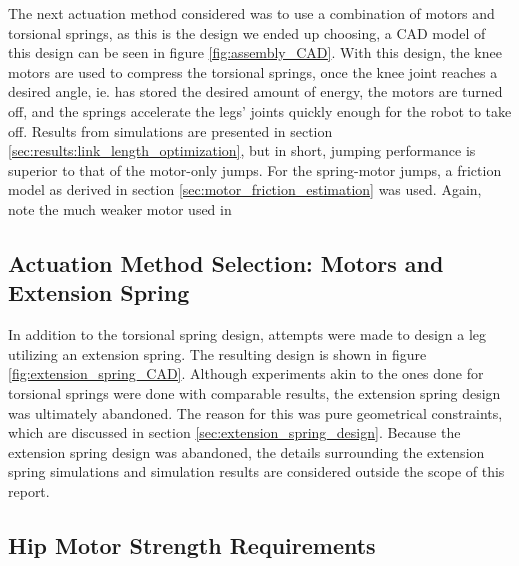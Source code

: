 The next actuation method considered was to use a combination of motors and torsional springs, as this is the design we ended up choosing, a CAD model of this design can be seen in figure \ref{fig:assembly_CAD}. With this design, the knee motors are used to compress the torsional springs, once the knee joint reaches a desired angle, ie. has stored the desired amount of energy, the motors are turned off, and the springs accelerate the legs' joints quickly enough for the robot to take off. Results from simulations are presented in section \ref{sec:results:link_length_optimization}, but in short, jumping performance is superior to that of the motor-only jumps. For the spring-motor jumps, a friction model as derived in section \ref{sec:motor_friction_estimation} was used. Again, note the much weaker motor used in 


\subsection{Actuation Method Selection: Motors and Extension Spring}

In addition to the torsional spring design, attempts were made to design a leg utilizing an extension spring. The resulting design is shown in figure \ref{fig:extension_spring_CAD}. Although experiments akin to the ones done for torsional springs were done with comparable results, the extension spring design was ultimately abandoned. The reason for this was pure geometrical constraints, which are discussed in section \ref{sec:extension_spring_design}. Because the extension spring design was abandoned, the details surrounding the extension spring simulations and simulation results are considered outside the scope of this report.

\subsection{Hip Motor Strength Requirements}
\label{sec:hip_motor_dimensioning_test_design}

